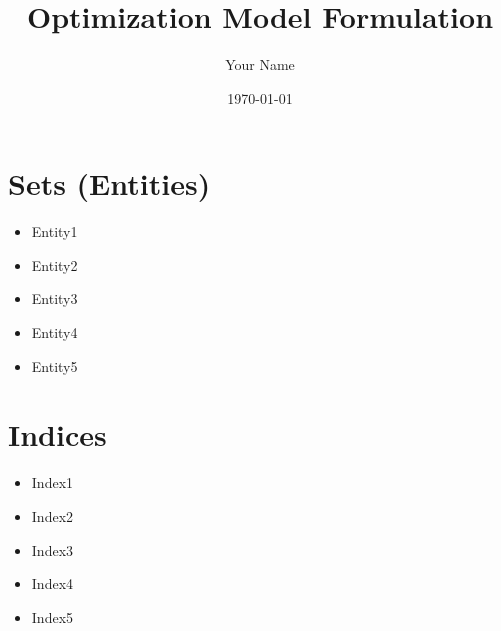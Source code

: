 \documentclass{article}
\title{Optimization Model Formulation}
\author{Your Name}
\date{\today}
\begin{document}
\maketitle
\tableofcontents

\section{Sets (Entities)}
\begin{itemize}
    \item Entity1
    \item Entity2
    \item Entity3
    \item Entity4
    \item Entity5
\end{itemize}

\section{Indices}
\begin{itemize}
    \item Index1
    \item Index2
    \item Index3
    \item Index4
    \item Index5
\end{itemize}
\end{document}
